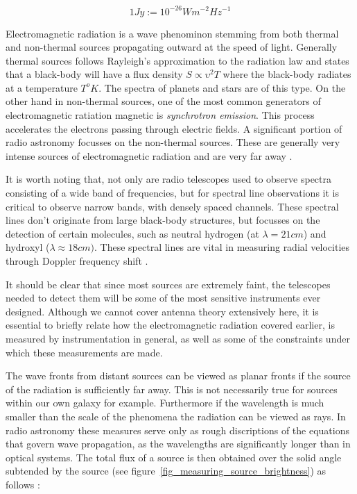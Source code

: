 \documentclass[a4paper,10pt]{report}
\begin{document}
\begin{equation*}
 1 Jy := 10^{-26}Wm^{-2}Hz^{-1}
\end{equation*}

Electromagnetic radiation is a wave phenominon stemming from both thermal and non-thermal sources propagating outward at the speed of light. Generally thermal sources follows Rayleigh's approximation to the radiation 
law and states that a black-body will have a flux density $S\propto \upsilon^2T$ where the black-body radiates at a temperature $T^oK$. The spectra of planets and stars are of this type. On the other hand in non-thermal 
sources, one of the most common generators of electromagnetic ratiation magnetic is \textit{synchrotron emission}. This process accelerates the electrons passing through electric fields. A significant portion of radio 
astronomy focusses on the non-thermal sources. These are generally very intense sources of electromagnetic radiation and are very far away \cite{christiansenradiotelescopes}.

It is worth noting that, not only are radio telescopes used to observe spectra consisting of a wide band of frequencies, but for spectral line observations it is critical to observe narrow bands, with densely spaced channels. 
These spectral lines don't originate from large black-body structures, but focusses on the detection of certain molecules, such as neutral hydrogen (at $\lambda = 21 cm$) and
hydroxyl ($\lambda \approx 18 cm)$. These spectral lines are vital in measuring radial velocities through Doppler frequency shift \cite{christiansenradiotelescopes,taylor1999synthesis}.

It should be clear that since most sources are extremely faint, the telescopes needed to detect them will be some of the most sensitive instruments ever designed. Although we cannot
cover antenna theory extensively here, it is essential to briefly relate how the electromagnetic radiation covered earlier, is measured by instrumentation in general, as well as some of the constraints under which
these measurements are made.

The wave fronts from distant sources can be viewed as planar fronts if the source of the radiation is sufficiently far away. This is not necessarily true for sources within our own galaxy for example. Furthermore 
if the wavelength is much smaller than the scale of the phenomena the radiation can be viewed as rays. In radio astronomy these measures serve only as rough discriptions of the 
equations that govern wave propagation, as the wavelengths are significantly longer than in optical systems.  The total flux of a source is then obtained over the solid angle subtended by the 
source (see figure~\ref{fig_measuring_source_brightness}) as follows \cite{wilson2009tools}:
\end{document}
